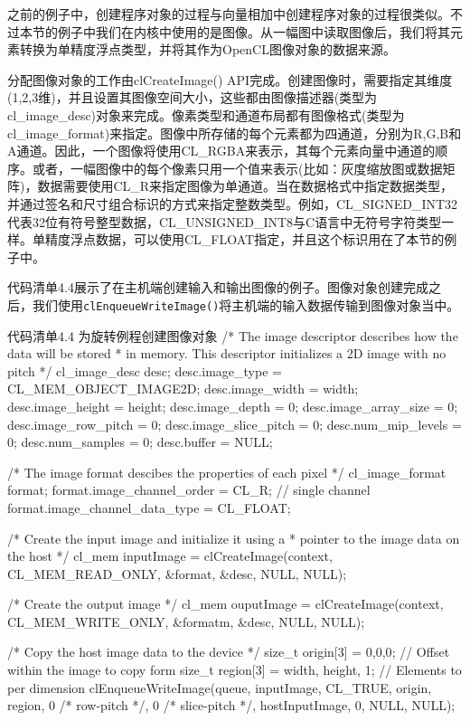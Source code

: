 之前的例子中，创建程序对象的过程与向量相加中创建程序对象的过程很类似。不过本节的例子中我们在内核中使用的是图像。从一幅图中读取图像后，我们将其元素转换为单精度浮点类型，并将其作为OpenCL图像对象的数据来源。

分配图像对象的工作由clCreateImage() API完成。创建图像时，需要指定其维度(1,2,3维)，并且设置其图像空间大小，这些都由图像描述器(类型为cl\_\allowbreak{}image\_\allowbreak{}desc)对象来完成。像素类型和通道布局都有图像格式(类型为cl\_\allowbreak{}image\_\allowbreak{}format)来指定。图像中所存储的每个元素都为四通道，分别为R,G,B和A通道。因此，一个图像将使用CL\_\allowbreak{}RGBA来表示，其每个元素向量中通道的顺序。或者，一幅图像中的每个像素只用一个值来表示(比如：灰度缩放图或数据矩阵)，数据需要使用CL\_\allowbreak{}R来指定图像为单通道。当在数据格式中指定数据类型，并通过签名和尺寸组合标识的方式来指定整数类型。例如，CL\_\allowbreak{}SIGNED\_\allowbreak{}INT32代表32位有符号整型数据，CL\_\allowbreak{}UNSIGNED\_\allowbreak{}INT8与C语言中无符号字符类型一样。单精度浮点数据，可以使用CL\_\allowbreak{}FLOAT指定，并且这个标识用在了本节的例子中。

代码清单4.4展示了在主机端创建输入和输出图像的例子。图像对象创建完成之后，我们使用\texttt{clEnqueueWriteImage()}将主机端的输入数据传输到图像对象当中。

\begin{codeboxt}[cpp]{代码清单4.4 为旋转例程创建图像对象}
/* The image descriptor describes how the data will be stored
 * in memory. This descriptor initializes a 2D image with no pitch */
cl_image_desc desc;
desc.image_type = CL_MEM_OBJECT_IMAGE2D;
desc.image_width = width;
desc.image_height = height;
desc.image_depth = 0;
desc.image_array_size = 0;
desc.image_row_pitch = 0;
desc.image_slice_pitch = 0;
desc.num_mip_levels = 0;
desc.num_samples = 0;
desc.buffer = NULL;

/* The image format descibes the properties of each pixel */
cl_image_format format;
format.image_channel_order = CL_R; // single channel
format.image_channel_data_type = CL_FLOAT;

/* Create the input image and initialize it using a
 * pointer to the image data on the host */
cl_mem inputImage = clCreateImage(context, CL_MEM_READ_ONLY, &format, &desc, NULL, NULL);

/* Create the output image */
cl_mem ouputImage = clCreateImage(context, CL_MEM_WRITE_ONLY, &formatm, &desc, NULL, NULL);

/* Copy the host image data to the device */
size_t origin[3] = {0,0,0}; // Offset within the image to copy form
size_t region[3] = {width, height, 1}; // Elements to per dimension
clEnqueueWriteImage(queue, inputImage, CL_TRUE,
  origin, region, 0 /* row-pitch */, 0 /* slice-pitch */,
  hostInputImage, 0, NULL, NULL);
\end{codeboxt}

